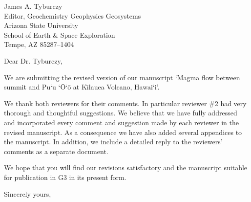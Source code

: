 \documentclass{letter}
\begin{document}
 
\begin{letter}
{James A. Tyburczy \\
Editor, Geochemistry Geophysics Geosystems \\ 
Arizona State University \\
School of Earth \& Space Exploration\\ 
Tempe, AZ 85287–1404}

\opening{Dear Dr. Tyburczy,}

We are submitting the revised version of our manuscript \lq Magma flow between summit and Pu`u `\=O`\=o at K\={\i}lauea Volcano, Hawai`i\rq. 

We thank both reviewers for their comments. In particular reviewer \#2 had very thorough and thoughtful suggestions. We believe that we have fully addressed and incorporated every comment and suggestion made by each reviewer in the revised manuscript. As a consequence we have also added several appendices to the manuscript. In addition, we include a detailed reply to the reviewers' comments as a separate document.

We hope that you will find our revisions satisfactory and the manuscript suitable for publication in G3 in its present form.

\vspace{1cm}
\closing{Sincerely yours,}

\end{letter}
\end{document}
